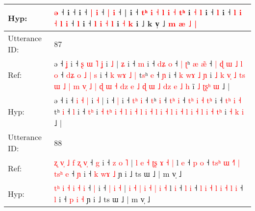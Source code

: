 \documentclass[10pt]{article}
\DeclareRobustCommand{\hl}[1]{{\textcolor{red}{#1}}}
\begin{document}
\begin{longtable}{ll}
 \\
Hyp: & \hl{}\hl{}\hl{ə} ˧\hl{}\hl{}\hl{}\hl{} i ˧\hl{}\hl{} i ˧ \hl{}\hl{}\hl{|} \hl{i} ˧ \hl{|} \hl{i} ˧ |\hl{}\hl{} i ˧\hl{}\hl{} \hl{}\hl{}\hl{t}\hl{ʰ} \hl{i} \hl{}\hl{˧} \hl{l} \hl{i} \hl{}\hl{˧} \hl{}\hl{t}\hl{ʰ} i\hl{}\hl{} \hl{˧} \hl{l} i ˧\hl{}\hl{} \hl{l} i ˧\hl{}\hl{} \hl{}\hl{l} \hl{i} \hl{˧} \hl{}\hl{}\hl{l} \hl{i} ˧ \hl{l} i ˧ \hl{l} \hl{}\hl{i} \hl{˧} \hl{l} i \hl{˧} \hl{k} i ˩ k v̩ ˩ \hl{m} \hl{æ} \hl{˩} \hl{|}
 \\
\midrule
Utterance ID: & 87 \\
Ref: & ə ˧\hl{ }\hl{ʝ} i ˧\hl{ }\hl{ʂ} \hl{ɯ} \hl{˥} \hl{ʝ} i \hl{˩} |\hl{ }\hl{ʑ} i ˧ \hl{m} i ˧ \hl{d}\hl{ʑ} \hl{o} ˧\hl{ }\hl{|} \hl{ʈ}ʰ\hl{ }\hl{æ} \hl{æ}\hl{̃} ˧\hl{ }\hl{|}\hl{ }\hl{ɖ}\hl{ }\hl{ɯ} \hl{˩}\hl{ }\hl{l} \hl{o} ˧ \hl{d}\hl{ʑ} \hl{o} \hl{˩} \hl{|}\hl{ }\hl{s} i ˧\hl{ }\hl{k} \hl{w}\hl{ɤ} \hl{˩} \hl{|} t\hl{s}ʰ \hl{e} ˧ \hl{ɲ} i ˧\hl{ }\hl{k}\hl{ }\hl{w}\hl{ɤ} \hl{˩}\hl{ }\hl{ɲ} i\hl{ }\hl{˩} \hl{k} \hl{v}\hl{̩} \hl{˩} \hl{t}\hl{s} \hl{ɯ} \hl{˩} \hl{|} \hl{m} \hl{v}\hl{̩} \hl{˩} \hl{|} \hl{ɖ} \hl{ɯ} \hl{˧} \hl{d}\hl{z} \hl{e} \hl{˩} \hl{ɖ} \hl{ɯ} \hl{˩} \hl{d}\hl{z} \hl{e} \hl{˩}\hl{ }\hl{h} i\hl{̃} \hl{˩} \hl{ʈ}\hl{ʂ}\hl{ʰ} \hl{ɯ} ˩ |
 \\
Hyp: & ə ˧\hl{}\hl{} i ˧\hl{}\hl{} \hl{i} \hl{˧} \hl{|} i \hl{˧} |\hl{}\hl{} i ˧ \hl{|} i ˧ \hl{t}\hl{ʰ} \hl{i} ˧\hl{}\hl{} \hl{t}ʰ\hl{}\hl{} \hl{}\hl{i} ˧\hl{}\hl{}\hl{}\hl{}\hl{}\hl{} \hl{}\hl{t}\hl{ʰ} \hl{i} ˧ \hl{t}\hl{ʰ} \hl{i} \hl{˧} \hl{}\hl{t}\hl{ʰ} i ˧\hl{}\hl{} \hl{t}\hl{ʰ} \hl{i} \hl{˧} t\hl{}ʰ \hl{i} ˧ \hl{l} i ˧\hl{}\hl{}\hl{}\hl{}\hl{} \hl{}\hl{t}\hl{ʰ} i\hl{}\hl{} \hl{˧} \hl{t}\hl{ʰ} \hl{i} \hl{}\hl{˧} \hl{l} \hl{i} \hl{˧} \hl{l} \hl{}\hl{i} \hl{˧} \hl{l} \hl{i} \hl{˧} \hl{l} \hl{}\hl{i} \hl{˧} \hl{l} \hl{i} \hl{˧} \hl{l} \hl{}\hl{i} \hl{˧} \hl{}\hl{t}\hl{ʰ} i\hl{} \hl{˧} \hl{}\hl{}\hl{k} \hl{i} ˩ |
 \\
\midrule
Utterance ID: & 88 \\
Ref: & \hl{ʐ}\hl{ }\hl{v}\hl{̩} \hl{˩} \hl{f} \hl{ʐ} \hl{v}\hl{̩} ˧ \hl{g} i ˧ \hl{z} \hl{o} \hl{˥} | \hl{l} \hl{e} \hl{˧} \hl{}\hl{ʈ}\hl{ʂ} \hl{ɤ} \hl{˧} \hl{|} l \hl{e} ˧ \hl{p} \hl{o} ˧ \hl{t}\hl{s}\hl{ʰ} \hl{ɯ} \hl{˧}\hl{˥} \hl{|} \hl{t}\hl{s}\hl{ʰ} \hl{e} ˧ \hl{ɲ} i ˧ \hl{k} \hl{w}\hl{ɤ} \hl{˩} ɲ i ˩ ts ɯ ˩ | m v̩ ˩
 \\
Hyp: & \hl{t}\hl{ʰ}\hl{ }\hl{i} \hl{˧} \hl{i} \hl{˧} \hl{}\hl{i} ˧ \hl{|} i ˧ \hl{|} \hl{i} \hl{˧} | \hl{i} \hl{˧} \hl{|} \hl{i}\hl{ }\hl{˧} \hl{|} \hl{i} \hl{˧} l \hl{i} ˧ \hl{l} \hl{i} ˧ \hl{l}\hl{ }\hl{i} \hl{˧} \hl{}\hl{l} \hl{i} \hl{˧}\hl{ }\hl{l} \hl{i} ˧ \hl{l} i ˧ \hl{p} \hl{}\hl{i} \hl{˧} ɲ i ˩ ts ɯ ˩ | m v̩ ˩

\end{longtable}
\end{document}
